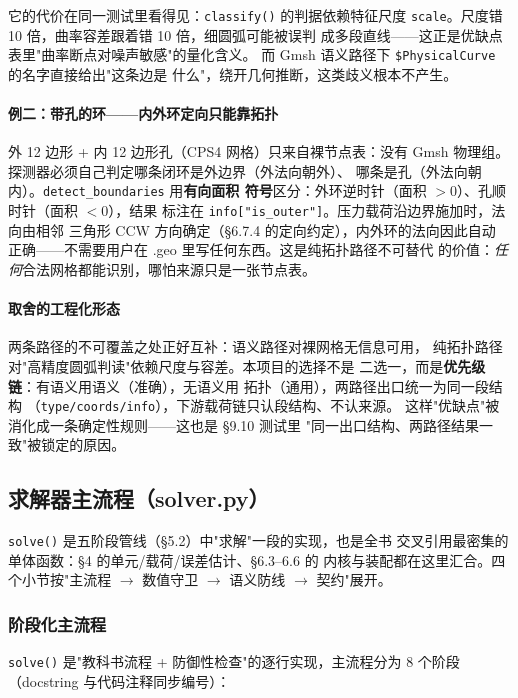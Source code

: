 \documentclass[12pt,a4paper]{ctexart}
\newcommand{\fem}{\Verb}
\begin{document}
它的代价在同一测试里看得见：\fem|classify()| 的判据依赖特征尺度
\fem|scale|。尺度错 10 倍，曲率容差跟着错 10 倍，细圆弧可能被误判
成多段直线——这正是优缺点表里"曲率断点对噪声敏感"的量化含义。
而 Gmsh 语义路径下 \fem|$PhysicalCurve| 的名字直接给出"这条边是
什么"，绕开几何推断，这类歧义根本不产生。

\paragraph{例二：带孔的环——内外环定向只能靠拓扑}

外 12 边形 + 内 12 边形孔（CPS4 网格）只来自裸节点表：没有 Gmsh
物理组。探测器必须自己判定哪条闭环是外边界（外法向朝外）、
哪条是孔（外法向朝内）。\fem|detect_boundaries| 用\textbf{有向面积
符号}区分：外环逆时针（面积 $>0$）、孔顺时针（面积 $<0$），结果
标注在 \fem|info["is_outer"]|。压力载荷沿边界施加时，法向由相邻
三角形 CCW 方向确定（§6.7.4 的定向约定），内外环的法向因此自动
正确——不需要用户在 .geo 里写任何东西。这是纯拓扑路径不可替代
的价值：\emph{任何}合法网格都能识别，哪怕来源只是一张节点表。

\paragraph{取舍的工程化形态}

两条路径的不可覆盖之处正好互补：语义路径对裸网格无信息可用，
纯拓扑路径对"高精度圆弧判读"依赖尺度与容差。本项目的选择不是
二选一，而是\textbf{优先级链}：有语义用语义（准确），无语义用
拓扑（通用），两路径出口统一为同一段结构
（\fem|type/coords/info|），下游载荷链只认段结构、不认来源。
这样"优缺点"被消化成一条确定性规则——这也是 §9.10 测试里
"同一出口结构、两路径结果一致"被锁定的原因。


\subsection{求解器主流程（solver.py）}

\fem|solve()| 是五阶段管线（§5.2）中"求解"一段的实现，也是全书
交叉引用最密集的单体函数：§4 的单元/载荷/误差估计、§6.3--6.6 的
内核与装配都在这里汇合。四个小节按"主流程 $\rightarrow$ 数值守卫
$\rightarrow$ 语义防线 $\rightarrow$ 契约"展开。

\subsubsection{阶段化主流程}

\fem|solve()| 是"教科书流程 + 防御性检查"的逐行实现，主流程分为
8 个阶段（docstring 与代码注释同步编号）：
\end{document}
